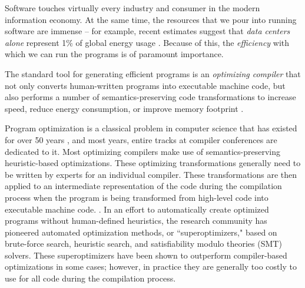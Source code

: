 \documentclass{article}
\begin{document}
 

Software touches virtually every industry and consumer in the modern information economy.
At the same time, the resources that we pour into running software are immense -- for example, recent estimates suggest that \emph{data centers alone} represent 1\% of global energy usage \citep{masanet2020recalibrating}.
Because of this, the \emph{efficiency} with which we can run the programs is of paramount importance.

The standard tool for generating efficient programs is an \emph{optimizing compiler} that not only converts human-written programs into executable machine code, but also performs a number of semantics-preserving code transformations to increase speed, reduce energy consumption, or improve memory footprint \citep{dragonbook}.

Program optimization is a classical problem in computer science that has existed for over 50 years \cite{mckeeman1965peephole, allen1971}, and most years, entire tracks at compiler conferences are dedicated to it. Most optimizing compilers make use of semantics-preserving heuristic-based optimizations. These optimizing transformations generally need to be written by experts for an individual compiler. These transformations are then applied to an intermediate representation of the code during the compilation process when the program is being transformed from high-level code into executable machine code.   .  In an effort to automatically create optimized programs without human-defined heuristics, the research community has pioneered automated optimization methods, or ``superoptimizers," based on brute-force search, heuristic search, and satisfiability modulo theories (SMT) solvers. These superoptimizers have been shown to outperform compiler-based optimizations in some cases; however, in practice they are generally too costly to use for all code during the compilation process. 
\end{document}
